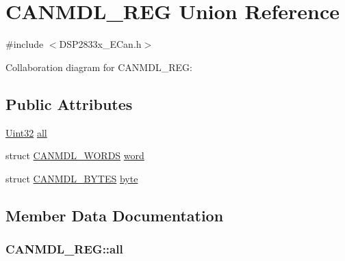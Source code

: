 \hypertarget{union_c_a_n_m_d_l___r_e_g}{}\section{C\+A\+N\+M\+D\+L\+\_\+\+R\+E\+G Union Reference}
\label{union_c_a_n_m_d_l___r_e_g}


{\ttfamily \#include $<$D\+S\+P2833x\+\_\+\+E\+Can.\+h$>$}



Collaboration diagram for C\+A\+N\+M\+D\+L\+\_\+\+R\+E\+G\+:
\subsection*{Public Attributes}
\begin{DoxyCompactItemize}
\item 
\hyperlink{_d_s_p2833x___device_8h_aba99025e657f892beb7ff31cecf64653}{Uint32} \hyperlink{union_c_a_n_m_d_l___r_e_g_ae85e8f43eb0eddda171a1134bc8162ff}{all}
\item 
struct \hyperlink{struct_c_a_n_m_d_l___w_o_r_d_s}{C\+A\+N\+M\+D\+L\+\_\+\+W\+O\+R\+D\+S} \hyperlink{union_c_a_n_m_d_l___r_e_g_aec3bd76f4220341514d3cfaad6eb2920}{word}
\item 
struct \hyperlink{struct_c_a_n_m_d_l___b_y_t_e_s}{C\+A\+N\+M\+D\+L\+\_\+\+B\+Y\+T\+E\+S} \hyperlink{union_c_a_n_m_d_l___r_e_g_a5683472ee6355778e87cc820a29a22b1}{byte}
\end{DoxyCompactItemize}


\subsection{Member Data Documentation}
\hypertarget{union_c_a_n_m_d_l___r_e_g_ae85e8f43eb0eddda171a1134bc8162ff}{}
\subsubsection[{all}]{ C\+A\+N\+M\+D\+L\+\_\+\+R\+E\+G\+::all}\label{union_c_a_n_m_d_l___r_e_g_ae85e8f43eb0eddda171a1134bc8162ff}
\hypertarget{union_c_a_n_m_d_l___r_e_g_a5683472ee6355778e87cc820a29a22b1}{}
